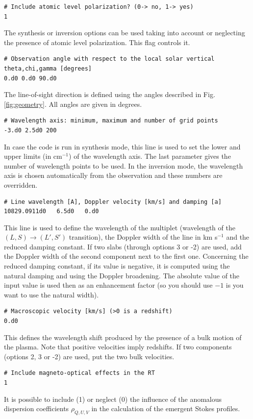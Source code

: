 \documentclass[12pt]{article}
\begin{document}
\begin{verbatim}
# Include atomic level polarization? (0-> no, 1-> yes)
1
\end{verbatim}
The synthesis or inversion options can be used taking into account or neglecting the presence of 
atomic level polarization. This flag controls it.

\begin{verbatim} 
# Observation angle with respect to the local solar vertical theta,chi,gamma [degrees]
0.d0 0.d0 90.d0
\end{verbatim}
The line-of-sight direction is defined using the angles described
in Fig. \ref{fig:geometry}. All angles are given in degrees.

\begin{verbatim}
# Wavelength axis: minimum, maximum and number of grid points
-3.d0 2.5d0 200
\end{verbatim}
In case the code is run in synthesis mode, this line is used to set the lower and upper
limits (in cm$^{-1}$) of the wavelength axis. The last parameter gives the number of wavelength
points to be used. In the inversion mode, the wavelength axis is chosen automatically from 
the observation and these numbers are overridden.

\begin{verbatim}
# Line wavelength [A], Doppler velocity [km/s] and damping [a]
10829.0911d0   6.5d0   0.d0
\end{verbatim}
This line is used to define the wavelength of the multiplet (wavelength of the 
$(L,S) \to (L',S')$ transition), the Doppler width of the
line in km s$^{-1}$ and the reduced damping constant.
If two slabs (through options 3 or -2) are used, add the Doppler width of the second component
next to the first one.
Concerning the reduced damping constant, if its value is negative, it is computed using the natural
damping and using the Doppler broadening. The absolute value of the input value is used then as
an enhancement factor (so you should use $-1$ is you want to use the natural width).

\begin{verbatim} 
# Macroscopic velocity [km/s] (>0 is a redshift)
0.d0
\end{verbatim}
This defines the wavelength shift produced by the presence of a bulk motion of the plasma.
Note that positive velocities imply redshifts. If two components (options 2, 3 or -2)
are used, put the two bulk velocities.

\begin{verbatim} 
# Include magneto-optical effects in the RT
1
\end{verbatim}
It is possible to include (1) or neglect (0) the influence of the anomalous dispersion coefficients $\rho_{Q,U,V}$
in the calculation of the emergent Stokes profiles.
\end{document}
